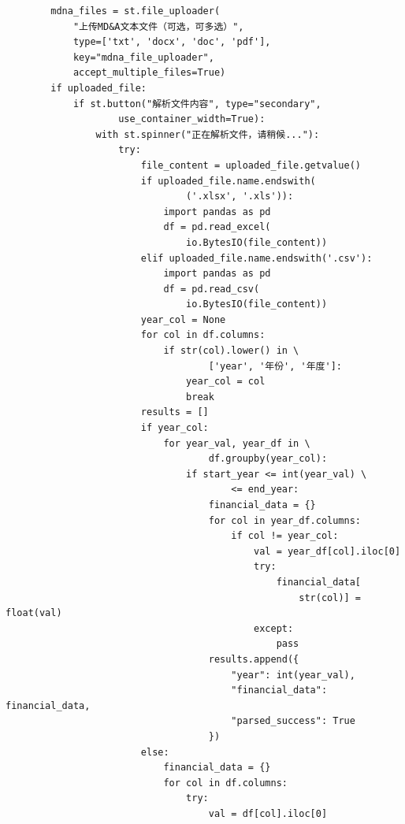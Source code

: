 \documentclass[a4paper,10pt]{article}
\begin{document}
\begin{lstlisting}
        mdna_files = st.file_uploader(
            "上传MD&A文本文件（可选，可多选）",
            type=['txt', 'docx', 'doc', 'pdf'],
            key="mdna_file_uploader",
            accept_multiple_files=True)
        if uploaded_file:
            if st.button("解析文件内容", type="secondary",
                    use_container_width=True):
                with st.spinner("正在解析文件，请稍候..."):
                    try:
                        file_content = uploaded_file.getvalue()
                        if uploaded_file.name.endswith(
                                ('.xlsx', '.xls')):
                            import pandas as pd
                            df = pd.read_excel(
                                io.BytesIO(file_content))
                        elif uploaded_file.name.endswith('.csv'):
                            import pandas as pd
                            df = pd.read_csv(
                                io.BytesIO(file_content))
                        year_col = None
                        for col in df.columns:
                            if str(col).lower() in \
                                    ['year', '年份', '年度']:
                                year_col = col
                                break
                        results = []
                        if year_col:
                            for year_val, year_df in \
                                    df.groupby(year_col):
                                if start_year <= int(year_val) \
                                        <= end_year:
                                    financial_data = {}
                                    for col in year_df.columns:
                                        if col != year_col:
                                            val = year_df[col].iloc[0]
                                            try:
                                                financial_data[
                                                    str(col)] = float(val)
                                            except:
                                                pass
                                    results.append({
                                        "year": int(year_val),
                                        "financial_data": financial_data,
                                        "parsed_success": True
                                    })
                        else:
                            financial_data = {}
                            for col in df.columns:
                                try:
                                    val = df[col].iloc[0]

\end{lstlisting}
\end{document}
